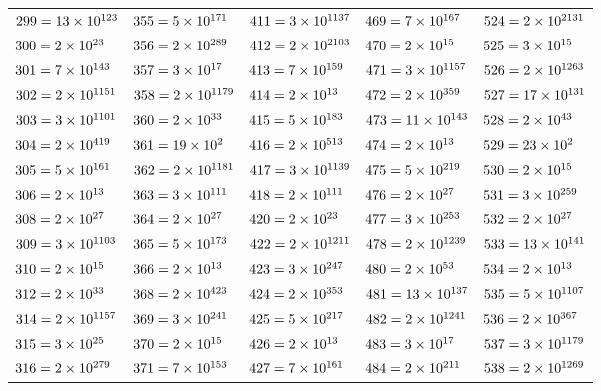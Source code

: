\documentclass[10pt,a4paper]{book}
\begin{document}
\begin{tabular}{lllll}
	$299=\num{13e{1}23e{1}}$&$355=\num{5e{1}71e{1}}$&$411=\num{3e{1}137e{1}}$&$469=\num{7e{1}67e{1}}$&$524=\num{2e{2}131e{1}}$\\
	$300=\num{2e{2}3e{1}5e{2}}$&$356=\num{2e{2}89e{1}}$&$412=\num{2e{2}103e{1}}$&$470=\num{2e{1}5e{1}47e{1}}$&$525=\num{3e{1}5e{2}7e{1}}$\\
	$301=\num{7e{1}43e{1}}$&$357=\num{3e{1}7e{1}17e{1}}$&$413=\num{7e{1}59e{1}}$&$471=\num{3e{1}157e{1}}$&$526=\num{2e{1}263e{1}}$\\
	$302=\num{2e{1}151e{1}}$&$358=\num{2e{1}179e{1}}$&$414=\num{2e{1}3e{2}23e{1}}$&$472=\num{2e{3}59e{1}}$&$527=\num{17e{1}31e{1}}$\\
	$303=\num{3e{1}101e{1}}$&$360=\num{2e{3}3e{2}5e{1}}$&$415=\num{5e{1}83e{1}}$&$473=\num{11e{1}43e{1}}$&$528=\num{2e{4}3e{1}11e{1}}$\\
	$304=\num{2e{4}19e{1}}$&$361=\num{19e{2}}$&$416=\num{2e{5}13e{1}}$&$474=\num{2e{1}3e{1}79e{1}}$&$529=\num{23e{2}}$\\
	$305=\num{5e{1}61e{1}}$&$362=\num{2e{1}181e{1}}$&$417=\num{3e{1}139e{1}}$&$475=\num{5e{2}19e{1}}$&$530=\num{2e{1}5e{1}53e{1}}$\\
	$306=\num{2e{1}3e{2}17e{1}}$&$363=\num{3e{1}11e{2}}$&$418=\num{2e{1}11e{1}19e{1}}$&$476=\num{2e{2}7e{1}17e{1}}$&$531=\num{3e{2}59e{1}}$\\
	$308=\num{2e{2}7e{1}11e{1}}$&$364=\num{2e{2}7e{1}13e{1}}$&$420=\num{2e{2}3e{1}5e{1}7e{1}}$&$477=\num{3e{2}53e{1}}$&$532=\num{2e{2}7e{1}19e{1}}$\\
	$309=\num{3e{1}103e{1}}$&$365=\num{5e{1}73e{1}}$&$422=\num{2e{1}211e{1}}$&$478=\num{2e{1}239e{1}}$&$533=\num{13e{1}41e{1}}$\\
	$310=\num{2e{1}5e{1}31e{1}}$&$366=\num{2e{1}3e{1}61e{1}}$&$423=\num{3e{2}47e{1}}$&$480=\num{2e{5}3e{1}5e{1}}$&$534=\num{2e{1}3e{1}89e{1}}$\\
	$312=\num{2e{3}3e{1}13e{1}}$&$368=\num{2e{4}23e{1}}$&$424=\num{2e{3}53e{1}}$&$481=\num{13e{1}37e{1}}$&$535=\num{5e{1}107e{1}}$\\
	$314=\num{2e{1}157e{1}}$&$369=\num{3e{2}41e{1}}$&$425=\num{5e{2}17e{1}}$&$482=\num{2e{1}241e{1}}$&$536=\num{2e{3}67e{1}}$\\
	$315=\num{3e{2}5e{1}7e{1}}$&$370=\num{2e{1}5e{1}37e{1}}$&$426=\num{2e{1}3e{1}71e{1}}$&$483=\num{3e{1}7e{1}23e{1}}$&$537=\num{3e{1}179e{1}}$\\
	$316=\num{2e{2}79e{1}}$&$371=\num{7e{1}53e{1}}$&$427=\num{7e{1}61e{1}}$&$484=\num{2e{2}11e{2}}$&$538=\num{2e{1}269e{1}}$\\

\end{tabular}
\end{document}
